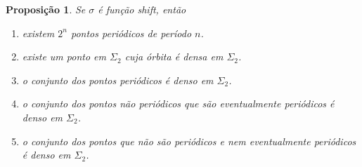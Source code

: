 \documentclass[a4paper, 12pt]{article}
\theoremstyle{definition}
\theoremstyle{plain}
\newtheorem{proposition}[definition]{Proposição}
\theoremstyle{plain}
\theoremstyle{plain}
\theoremstyle{definition}
\theoremstyle{remark}
\begin{document}
\begin{proposition}
Se $\sigma$ é função shift, então
\begin{enumerate}
\item existem $2^n$ pontos periódicos de período $n$.
\item existe um ponto em $\Sigma_2$ cuja órbita é densa em $\Sigma_2$.
\item o conjunto dos pontos periódicos é denso em $\Sigma_2$.
\item o conjunto dos pontos não periódicos que são eventualmente periódicos é denso em $\Sigma_2$.
\item o conjunto dos pontos que não são periódicos e nem eventualmente periódicos é denso em $\Sigma_2$.
\end{enumerate}
\end{proposition}
\end{document}
